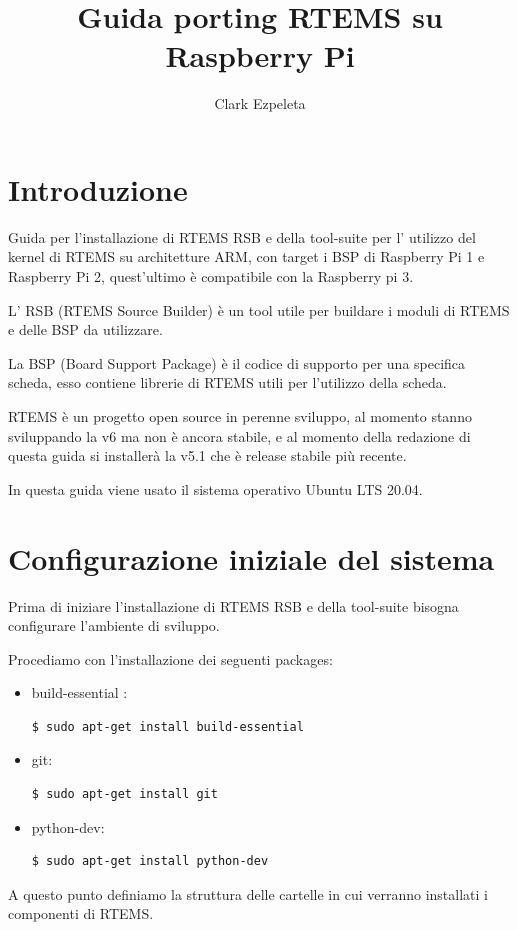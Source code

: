 \documentclass[12pt, a4paper]{article}
\title{Guida porting RTEMS su Raspberry Pi}
\author{Clark Ezpeleta}
\date{}
\begin{document}
\maketitle
\begin{flushleft}
\section{Introduzione}
Guida per l'installazione di RTEMS RSB e della tool-suite per l' utilizzo del kernel di RTEMS su architetture ARM, con target i BSP di Raspberry Pi 1 e Raspberry Pi 2, quest'ultimo è compatibile con la Raspberry pi 3.

L' RSB (RTEMS Source Builder) è un tool utile per buildare i moduli di RTEMS e delle BSP da utilizzare.

La BSP (Board Support Package) è il codice di supporto per una specifica scheda, esso contiene librerie di RTEMS utili per l'utilizzo della scheda.

RTEMS è un progetto open source in perenne sviluppo, al momento stanno sviluppando la v6 ma non è ancora stabile, e al momento della redazione di questa guida si installerà la v5.1 che è release stabile più recente.

In questa guida viene usato il sistema operativo Ubuntu LTS 20.04.
\newpage
\section{Configurazione iniziale del sistema}
Prima di iniziare l'installazione di RTEMS RSB e della tool-suite bisogna configurare l'ambiente di sviluppo.

Procediamo con l'installazione dei seguenti packages:
\begin{itemize}
\item  build-essential : 
\begin{lstlisting}[style=BashStyle] 
$ sudo apt-get install build-essential
\end{lstlisting}
\item git:
\begin{lstlisting}[language=bash] 
$ sudo apt-get install git
\end{lstlisting}
\item python-dev:
\begin{lstlisting}[style=BashStyle] 
 $ sudo apt-get install python-dev
 \end{lstlisting}
\end{itemize}
A questo punto definiamo la struttura delle cartelle in cui verranno installati i componenti di RTEMS.


\end{flushleft}
\end{document}
